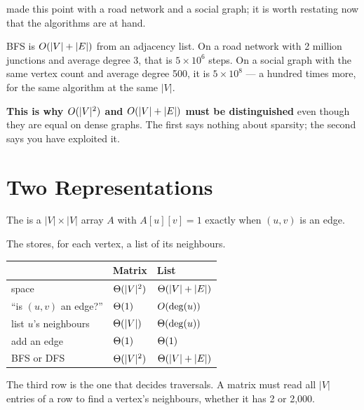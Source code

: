 \begin{conceptbox}
 made this point with a road network and a social graph; it is
worth restating now that the algorithms are at hand.

\smallskip
BFS is $O(|V| + |E|)$ from an adjacency list. On a road network with
2 million junctions and average degree 3, that is $5 \times 10^{6}$ steps. On a
social graph with the same vertex count and average degree 500, it is
$5 \times 10^{8}$ --- a hundred times more, for the same algorithm at the same
$|V|$.

\smallskip
\textbf{This is why $O(|V|^{2})$ and $O(|V| + |E|)$ must be
distinguished} even though they are equal on dense graphs. The first says
nothing about sparsity; the second says you have exploited it.
\end{conceptbox}

\section{Two Representations}

\begin{definitionbox}
The  is a $|V| \times |V|$ array $A$ with
$A[u][v] = 1$ exactly when $(u,v)$ is an edge.

\smallskip
The  stores, for each vertex, a list of its neighbours.

\medskip
{}
\begin{longtable}{@{}L{4.2cm}L{4.6cm}L{5.0cm}@{}}
\toprule
{}
& \textbf{Matrix} & \textbf{List} \\
\midrule
\endhead
space & $\Theta(|V|^{2})$ & $\Theta(|V| + |E|)$ \\
``is $(u,v)$ an edge?'' & $\Theta(1)$ & $O(\deg(u))$ \\
list $u$'s neighbours & $\Theta(|V|)$ & $\Theta(\deg(u))$ \\
add an edge & $\Theta(1)$ & $\Theta(1)$ \\
BFS or DFS & $\Theta(|V|^{2})$ & $\Theta(|V|+|E|)$ \\
\bottomrule
\end{longtable}

\smallskip
The third row is the one that decides traversals. A matrix must read all $|V|$
entries of a row to find a vertex's neighbours, whether it has 2 or 2{,}000.
\end{definitionbox}


